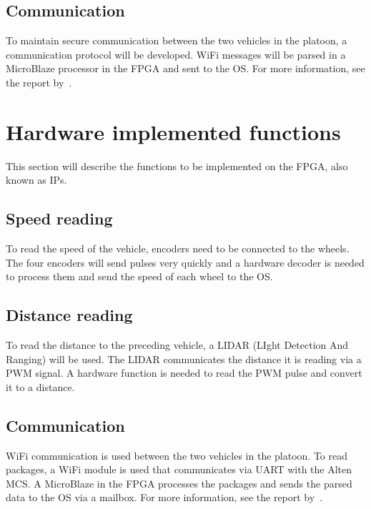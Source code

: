 \subsection{Communication}
To maintain secure communication between the two vehicles in the platoon, a communication protocol will be developed. WiFi messages will be parsed in a MicroBlaze processor in the FPGA and sent to the OS. For more information, see the report by~\cite{lerander2017}.


\section{Hardware implemented functions}
This section will describe the functions to be implemented on the FPGA, also known as IPs.

\subsection{Speed reading}
To read the speed of the vehicle, encoders need to be connected to the wheels. The four encoders will send pulses very quickly and a hardware decoder is needed to process them and send the speed of each wheel to the OS.

\subsection{Distance reading}
To read the distance to the preceding vehicle, a LIDAR (LIght Detection And Ranging) will be used. The LIDAR communicates the distance it is reading via a PWM signal. A hardware function is needed to read the PWM pulse and convert it to a distance.

\subsection{Communication}
WiFi communication is used between the two vehicles in the platoon. To read packages, a WiFi module is used that communicates via UART with the Alten MCS. A MicroBlaze in the FPGA processes the packages and sends the parsed data to the OS via a mailbox. For more information, see the report by~\cite{lerander2017}.

